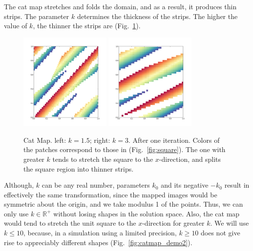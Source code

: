 \documentclass[12pt]{reedmcm}
\begin{document}
The cat map stretches and folds the domain, and as a result, it produces thin strips.
The parameter $k$ determines the thickness of the strips.
The higher the value of $k$, the thinner the strips are (Fig.~\ref{fig:catmap_demo1}).
\begin{figure}[t]
  \centering
  \includegraphics[width=0.4\textwidth]{catmap_1-5}
  \hspace{2cm}
  \includegraphics[width=0.4\textwidth]{catmap_3}
  \caption{Cat Map. left: $k=1.5$; right: $k = 3$. After one iteration. 
    Colors of the patches correspond to those in (Fig.~\ref{fig:square}).
    The one with greater $k$ tends to stretch the square to the $x$-direction, and splits the square region into thinner strips.
  }
  \label{fig:catmap_demo1}
\end{figure}

Although, $k$ can be any real number, parameters $k_0$ and its negative $-k_0$ result in effectively the same transformation, since the mapped images would be symmetric about the origin, and we take modulus 1 of the points.
Thus, we can only use $k \in \mathbb{R}^+$ without losing shapes in the solution space.
Also, the cat map would tend to stretch the unit square to the $x$-direction for greater $k$.
We will use $k \leq 10$, because, in a simulation using a limited precision, $k\geq 10$ does not give rise to appreciably different shapes (Fig.~\ref{fig:catmap_demo2}).
\end{document}
